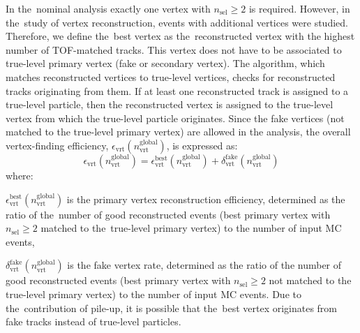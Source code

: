 In the~nominal analysis exactly one vertex with $n_\textrm{sel}\geq 2$ is required.  However, in the~study of vertex reconstruction, events with additional vertices were studied. Therefore, we define the~best vertex as the~reconstructed vertex with the highest number of TOF-matched tracks. This vertex does not have to be associated to true-level primary vertex (fake or secondary vertex). The algorithm, which matches reconstructed vertices to true-level vertices,  checks for reconstructed tracks originating from them. If at least one reconstructed track  is assigned to a true-level particle, then the reconstructed vertex is assigned to the true-level vertex from which the true-level particle originates. Since the fake vertices (not matched to the true-level primary vertex) are allowed in the analysis, the overall vertex-finding efficiency, $\epsilon_\textrm{vrt}\left(n_\textrm{vrt}^\textrm{global}\right)$, is expressed as:
\begin{equation}
\epsilon_\textrm{vrt}\left(n_\textrm{vrt}^\textrm{global}\right)=\epsilon_\textrm{vrt}^\textrm{best}\left(n_\textrm{vrt}^\textrm{global}\right)+\delta_\textrm{vrt}^\textrm{fake}\left(n_\textrm{vrt}^\textrm{global}\right)
\end{equation}
where:
\begin{description}
	\item $\epsilon_\textrm{vrt}^\textrm{best}\left(n_\textrm{vrt}^\textrm{global}\right)$ is the primary vertex reconstruction efficiency, determined as the ratio of the~number of good reconstructed events (best primary vertex with $n_\textrm{sel}\geq 2$ matched to the~true-level primary vertex) to the number of input MC events,
	\item $\delta_\textrm{vrt}^\textrm{fake}\left(n_\textrm{vrt}^\textrm{global}\right)$ is the fake vertex rate, determined as the ratio of the number of good reconstructed events (best primary vertex with $n_\textrm{sel}\geq 2$  not matched to the true-level primary vertex) to the number of input MC events. Due to the~contribution of pile-up, it is possible that the~best vertex originates from fake tracks instead of true-level particles.
\end{description}

